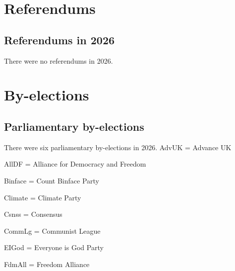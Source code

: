 \documentclass[a4paper,openany]{book}
\begin{document}



\part{Referendums}

\chapter{Referendums in 2026}

There were no referendums in 2026.
%
%

\part{By-elections}

\chapter{Parliamentary by-elections}

There were six parliamentary by-elections in 2026.
%
AdvUK = Advance UK

%
AllDF = Alliance for Democracy and Freedom

Binface = Count Binface Party

Climate = Climate Party

Csnss = Consensus

CommLg = Communist League

EIGod = Everyone is God Party

FdmAll = Freedom Alliance
\end{document}
